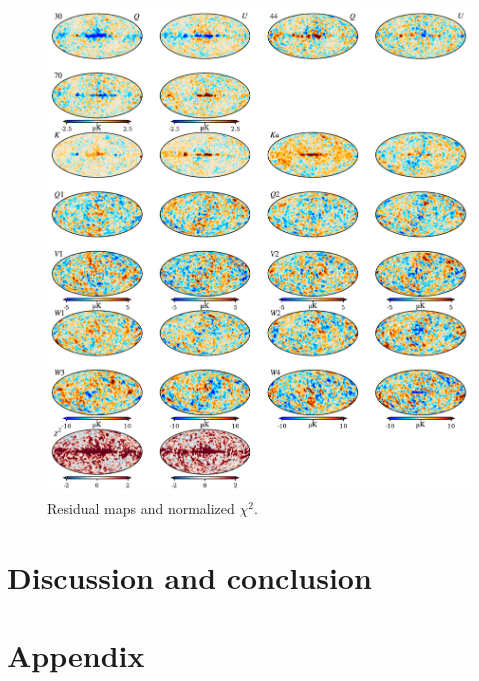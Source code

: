 \documentclass[twocolumn]{../../common/aa}
\begin{document}
\begin{figure}
	\centering
	\includegraphics[width=\linewidth]{figures/comm1_res_QU.pdf}
	\caption{Residual maps and normalized $\chi^2$. }
	\label{fig:res_QU}
\end{figure}





\section{Discussion and conclusion}
\label{sec:conclusion}






%





\appendix

\section{Appendix}
\end{document}
